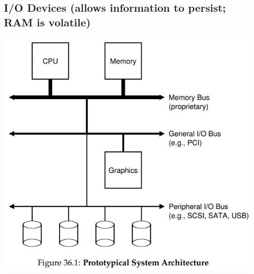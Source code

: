 \documentclass[8pt,a4paper,landscape]{extarticle}
\begin{document}
\pagestyle{empty}

\begin{multicols*}{3}
% 
% 
% 
% 

% 
% 
% 
% 
% 
% 
% 
% 
% 
% 
% 
% 
\section*{I/O Devices (allows information to persist; RAM is volatile)}
\begin{minipage}{.5\linewidth}
\includegraphics[width=\linewidth]{imgs/prototypical_sys_arch}
\end{minipage}
\begin{minipage}{.5\linewidth}

\end{minipage}
\end{multicols*}
\end{document}
